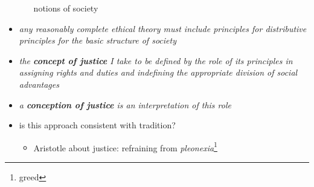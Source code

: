 \begin{itemize}
\begin{itemize}
		notions of society
	\end{itemize}
	\item \textit{
		any reasonably complete ethical theory must include principles
		for distributive principles for the basic structure of society
	}
	\item \textit{the \textbf{concept of justice} I take to be defined
	by the role
	of its principles in assigning rights and duties and indefining the
	appropriate division of social advantages}
	\item \textit{a \textbf{conception of justice} is an interpretation of
	this role}
	\item is this approach consistent with tradition?
	\begin{itemize}
		\item Aristotle about justice: refraining from \textit{
		pleonexia}\footnote{greed}
	\end{itemize}
\end{itemize}

